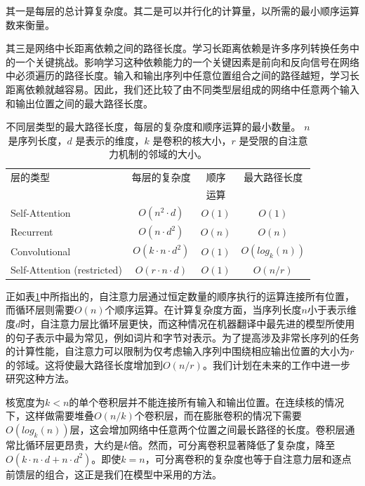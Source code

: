 \documentclass[lang=cn,a4paper,newtx]{elegantpaper}
\begin{document}
其一是每层的总计算复杂度。其二是可以并行化的计算量，以所需的最小顺序运算数来衡量。

其三是网络中长距离依赖之间的路径长度。学习长距离依赖是许多序列转换任务中的一个关键挑战。影响学习这种依赖能力的一个关键因素是前向和反向信号在网络中必须遍历的路径长度。输入和输出序列中任意位置组合之间的路径越短，学习长距离依赖就越容易。因此，我们还比较了由不同类型层组成的网络中任意两个输入和输出位置之间的最大路径长度。

\begin{table}[t]
\caption{
  不同层类型的最大路径长度，每层的复杂度和顺序运算的最小数量。 $n$ 是序列长度，$d$ 是表示的维度，$k$ 是卷积的核大小，$r$ 是受限的自注意力机制的邻域的大小。}
\label{tab:op_complexities}
\begin{center}
\vspace{-1mm}

\begin{tabular}{lccc}
\toprule
层的类型   & 每层的复杂度 & 顺序 & 最大路径长度  \\
           &             & 运算 &   \\
\hline
\rule{0pt}{2.0ex}Self-Attention & $O(n^2 \cdot d)$ & $O(1)$ & $O(1)$ \\
Recurrent & $O(n \cdot d^2)$ & $O(n)$ & $O(n)$ \\

Convolutional & $O(k \cdot n \cdot d^2)$ & $O(1)$ & $O(log_k(n))$ \\
Self-Attention (restricted)& $O(r \cdot n \cdot d)$ & $O(1)$ & $O(n/r)$ \\

\bottomrule
\end{tabular}
\end{center}
\end{table}

正如表\ref{tab:op_complexities}中所指出的，自注意力层通过恒定数量的顺序执行的运算连接所有位置，而循环层则需要$O(n)$个顺序运算。在计算复杂度方面，当序列长度$n$小于表示维度$d$时，自注意力层比循环层更快，而这种情况在机器翻译中最先进的模型所使用的句子表示中最为常见，例如词片和字节对表示。为了提高涉及非常长序列的任务的计算性能，自注意力可以限制为仅考虑输入序列中围绕相应输出位置的大小为$r$的邻域。这将使最大路径长度增加到$O(n/r)$。我们计划在未来的工作中进一步研究这种方法。

核宽度为$k < n$的单个卷积层并不能连接所有输入和输出位置。在连续核的情况下，这样做需要堆叠$O(n/k)$个卷积层，而在膨胀卷积的情况下需要$O(log_k(n))$层，这会增加网络中任意两个位置之间最长路径的长度。卷积层通常比循环层更昂贵，大约是$k$倍。然而，可分离卷积显著降低了复杂度，降至$O(k \cdot n \cdot d + n \cdot d^2)$。即使$k=n$，可分离卷积的复杂度也等于自注意力层和逐点前馈层的组合，这正是我们在模型中采用的方法。
\end{document}
